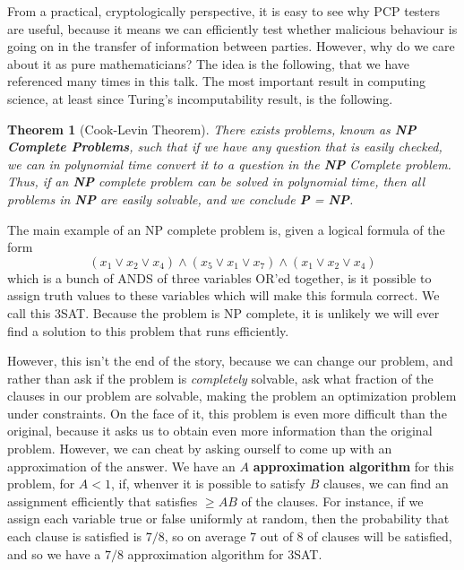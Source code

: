 \documentclass{article}
\theoremstyle{plain}
\newtheorem{theorem}{Theorem}
\theoremstyle{definition}
\begin{document}
From a practical, cryptologically perspective, it is easy to see why PCP testers are useful, because it means we can efficiently test whether malicious behaviour is going on in the transfer of information between parties. However, why do we care about it as pure mathematicians? The idea is the following, that we have referenced many times in this talk. The most important result in computing science, at least since Turing's incomputability result, is the following.

\begin{theorem}[Cook-Levin Theorem]
    There exists problems, known as {\bf NP Complete Problems}, such that if we have any question that is easily checked, we can in polynomial time convert it to a question in the {\bf NP} Complete problem. Thus, if an {\bf NP} complete problem can be solved in polynomial time, then {\it all} problems in {\bf NP} are easily solvable, and we conclude {\bf P} = {\bf NP}.
\end{theorem}

The main example of an NP complete problem is, given a logical formula of the form
%
\[ (x_1 \vee x_2 \vee x_4) \wedge (x_5 \vee x_1 \vee x_7) \wedge (x_1 \vee x_2 \vee x_4) \]
%
which is a bunch of ANDS of three variables OR'ed together, is it possible to assign truth values to these variables which will make this formula correct. We call this 3SAT. Because the problem is NP complete, it is unlikely we will ever find a solution to this problem that runs efficiently.

However, this isn't the end of the story, because we can change our problem, and rather than ask if the problem is {\it completely} solvable, ask what fraction of the clauses in our problem are solvable, making the problem an optimization problem under constraints. On the face of it, this problem is even more difficult than the original, because it asks us to obtain even more information than the original problem. However, we can cheat by asking ourself to come up with an approximation of the answer. We have an $A$ {\bf approximation algorithm} for this problem, for $A < 1$, if, whenver it is possible to satisfy $B$ clauses, we can find an assignment efficiently that satisfies $\geq AB$ of the clauses. For instance, if we assign each variable true or false uniformly at random, then the probability that each clause is satisfied is $7/8$, so on average $7$ out of $8$ of clauses will be satisfied, and so we have a $7/8$ approximation algorithm for 3SAT.
\end{document}
